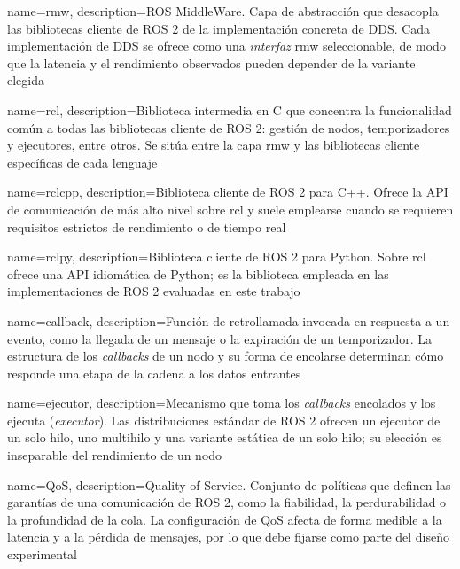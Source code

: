{
    name={rmw},
    description={ROS MiddleWare. Capa de abstracción que desacopla las
    bibliotecas cliente de ROS 2 de la implementación concreta de DDS. Cada
    implementación de DDS se ofrece como una \emph{interfaz} rmw
    seleccionable, de modo que la latencia y el rendimiento observados pueden
    depender de la variante elegida}
}

{
    name={rcl},
    description={Biblioteca intermedia en C que concentra la funcionalidad
    común a todas las bibliotecas cliente de ROS 2: gestión de nodos,
    temporizadores y ejecutores, entre otros. Se sitúa entre la capa rmw y las
    bibliotecas cliente específicas de cada lenguaje}
}

{
    name={rclcpp},
    description={Biblioteca cliente de ROS 2 para C++. Ofrece la API de
    comunicación de más alto nivel sobre rcl y suele emplearse cuando se
    requieren requisitos estrictos de rendimiento o de tiempo real}
}

{
    name={rclpy},
    description={Biblioteca cliente de ROS 2 para Python. Sobre rcl ofrece una
    API idiomática de Python; es la biblioteca empleada en las
    implementaciones de ROS 2 evaluadas en este trabajo}
}

{
    name={callback},
    description={Función de retrollamada invocada en respuesta a un evento,
    como la llegada de un mensaje o la expiración de un temporizador. La
    estructura de los \emph{callbacks} de un nodo y su forma de encolarse
    determinan cómo responde una etapa de la cadena a los datos entrantes}
}

{
    name={ejecutor},
    description={Mecanismo que toma los \emph{callbacks} encolados y los
    ejecuta (\emph{executor}). Las distribuciones estándar de ROS 2 ofrecen un
    ejecutor de un solo hilo, uno multihilo y una variante estática de un solo
    hilo; su elección es inseparable del rendimiento de un nodo}
}

{
    name={QoS},
    description={Quality of Service. Conjunto de políticas que definen las
    garantías de una comunicación de ROS 2, como la fiabilidad, la
    perdurabilidad o la profundidad de la cola. La configuración de QoS afecta
    de forma medible a la latencia y a la pérdida de mensajes, por lo que debe
    fijarse como parte del diseño experimental}
}


